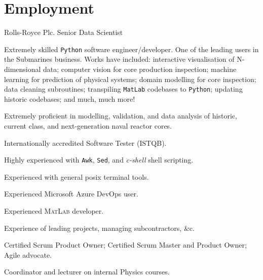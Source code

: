 \documentclass[margin,line]{resume}
\begin{document}
\begin{resume}
\begin{description}
	\end{description}

	\section{\mysidestyle Employment}\vspace{1mm}

	\begin{description}

		\item[September 2022--] Rolls-Royce Plc. Senior Data Scientist

		\item Extremely skilled \texttt{Python} software engineer/developer.
		      One of the leading users in the Submarines business. Works have
		      included:
		      interactive visualisation of N-dimensional data;
		      computer vision for core production inspection;
		      machine learning for prediction of physical systems;
		      domain modelling for core inspection;
		      data cleaning subroutines;
		      transpiling \texttt{MatLab} codebases to \texttt{Python};
		      updating historic codebases;
		      and much, much more!

		\item Extremely proficient in modelling, validation, and data analysis
		      of historic, current class, and next-generation naval
		      reactor cores.

		\item Internationally accredited Software Tester (ISTQB).

		\item Highly experienced with \texttt{Awk}, \texttt{Sed}, and
		      \textit{c-shell} shell scripting.

		\item Experienced with general posix terminal tools.

		\item Experienced Microsoft Azure DevOps user.

		\item Experienced \textsc{MatLab} developer.

		\item Experience of leading projects, managing subcontractors, \&c.

		\item Certified Scrum Product Owner; Certified Scrum Master and Product
		      Owner; Agile advocate.

		\item Coordinator and lecturer on internal Physics courses.


\end{description}
\end{resume}
\end{document}
